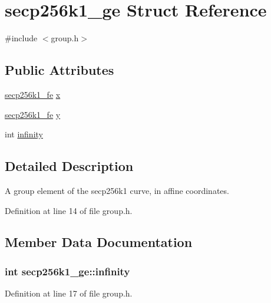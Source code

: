 \hypertarget{structsecp256k1__ge}{}\section{secp256k1\+\_\+ge Struct Reference}
\label{structsecp256k1__ge}


{\ttfamily \#include $<$group.\+h$>$}

\subsection*{Public Attributes}
\begin{DoxyCompactItemize}
\item 
\hyperlink{structsecp256k1__fe}{secp256k1\+\_\+fe} \hyperlink{structsecp256k1__ge_a3c04a97b606c82ea87e55d4a06f06b6e}{x}
\item 
\hyperlink{structsecp256k1__fe}{secp256k1\+\_\+fe} \hyperlink{structsecp256k1__ge_a604295983a1f4aa6e8b5b0f1e46f9ee0}{y}
\item 
int \hyperlink{structsecp256k1__ge_a1cdb35fe7abf6f17c08e4375eeb26628}{infinity}
\end{DoxyCompactItemize}


\subsection{Detailed Description}
A group element of the secp256k1 curve, in affine coordinates. 

Definition at line 14 of file group.\+h.



\subsection{Member Data Documentation}
\hypertarget{structsecp256k1__ge_a1cdb35fe7abf6f17c08e4375eeb26628}{}
\subsubsection[{infinity}]{\setlength{\rightskip}{0pt plus 5cm}int secp256k1\+\_\+ge\+::infinity}\label{structsecp256k1__ge_a1cdb35fe7abf6f17c08e4375eeb26628}


Definition at line 17 of file group.\+h.

\hypertarget{structsecp256k1__ge_a3c04a97b606c82ea87e55d4a06f06b6e}{}
